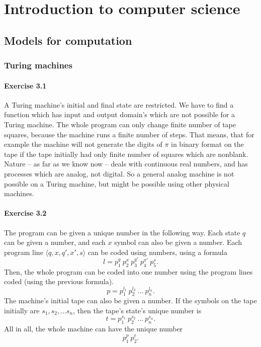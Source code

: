 \documentclass[a4paper,12pt]{article}
\newcommand{\exercise}[1]{\paragraph{Exercise #1}}
\newcommand{\la}{\langle}
\newcommand{\ra}{\rangle}
\begin{document}
    \section{Introduction to computer science}

    \subsection{Models for computation}

    \subsubsection{Turing machines}

    \exercise{3.1} A Turing machine's initial and final state are restricted. We have to find a function which has input and output domain's which are not possible for a Turing machine. The whole program can only change finite number of tape squares, because the machine runs a finite number of steps. That means, that for example the machine will not generate the digits of $\pi$ in binary format on the tape if the tape initially had only finite number of squares which are nonblank. Nature -- as far as we know now -- deals with continuous real numbers, and has processes which are analog, not digital. So a general analog machine is not possible on a Turing machine, but might be possible using other physical machines.

    \exercise{3.2} The program can be given a unique number in the following way. Each state $q$ can be given a number, and each $x$ symbol can also be given a number. Each program line $\la q, x, q', x', s \ra$ can be coded using numbers, using a formula
    \begin{equation}
        l = p_1^q \ p_2^x \ p_3^{q'} \ p_4^{x'} \ p_5^s \textrm{.}
    \end{equation}
    Then, the whole program can be coded into one number using the program lines coded (using the previous formula).
    \begin{equation}
        p = p_1^{l_1} \ p_2^{l_2} \ \ldots \ p_n^{l_n} \textrm{.}
    \end{equation}
    The machine's initial tape can also be given a number. If the symbols on the tape initially are $s_1, s_2, \ldots s_n$, then the tape's state's unique number is
    \begin{equation}
        t = p_1^{s_1} \ p_2^{s_2} \ \ldots \ p_n^{s_n} \textrm{.}
    \end{equation}
    All in all, the whole machine can have the unique number
    \begin{equation}
        p_1^p \ p_2^t \textrm{.}
    \end{equation}
\end{document}
